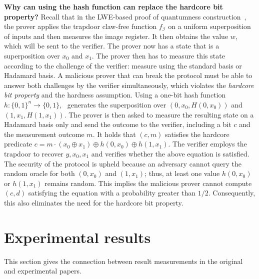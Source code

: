 \textbf{Why can using the hash function can replace the hardcore bit property?} Recall that in the LWE-based proof of quantumness construction~\cite{Brakerski18_Interactiveproofofquantumness}, the prover applies the trapdoor claw-free function $f_{\mathcal{I}}$ on a uniform superposition of inputs and then measures the image register. It then obtains the value $w$, which will be sent to the verifier. The prover now has a state that is a superposition over $x_0$ and $x_1$. The prover then has to measure this state according to the challenge of the verifier: measure using the standard basis or Hadamard basis. A malicious prover that can break the protocol must be able to answer both challenges by the verifier simultaneously, which violates the \textit{hardcore bit property} and the hardness assumption. Using a one-bit hash function $h:\{0,1\}^n\to \{0,1\}$,~\cite{BrakerskiProofofQuantumness} generates the superposition over $(0,x_0,H(0,x_0))$ and $(1,x_1,H(1,x_1))$. The prover is then asked to measure the resulting state on a Hadamard basis only and send the outcome to the verifier, including a bit $c$ and the measurement outcome $m$. It holds that $(c,m)$ satisfies the hardcore predicate $c=m\cdot(x_0\oplus x_1)\oplus h(0,x_0)\oplus h(1,x_1)$. The verifier employs the trapdoor to recover $y,x_0,x_1$ and verifies whether the above equation is satisfied. The security of the protocol is upheld because an adversary cannot query the random oracle for both $(0,x_0)$ and $(1,x_1)$; thus, at least one value $h(0,x_0)$ or $h(1,x_1)$ remains random. This implies the malicious prover cannot compute $(c,d)$ satisfying the equation with a probability greater than $1/2$. Consequently, this also eliminates the need for the hardcore bit property.

\section{Experimental results}

This section gives the connection between result measurements in the original and experimental papers.

